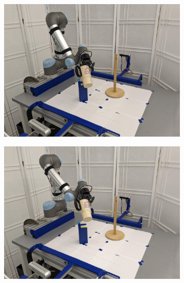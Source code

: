 \documentclass{article}
\begin{document}
\begin{figure}[]
\begin{subfigure}{(\linewidth - 0.05\linewidth)/5}
        \includegraphics[width=\linewidth]{figures/episodes/mug_on_tree/5.jpg}
    \end{subfigure}
    \begin{subfigure}{(\linewidth - 0.05\linewidth)/5}
        \centering
        \includegraphics[width=\linewidth]{figures/episodes/mug_on_tree/6.jpg}
    \end{subfigure}
    \begin{subfigure}{(\linewidth - 0.05\linewidth)/5}
        \centering

\end{subfigure}
\end{figure}
\end{document}

